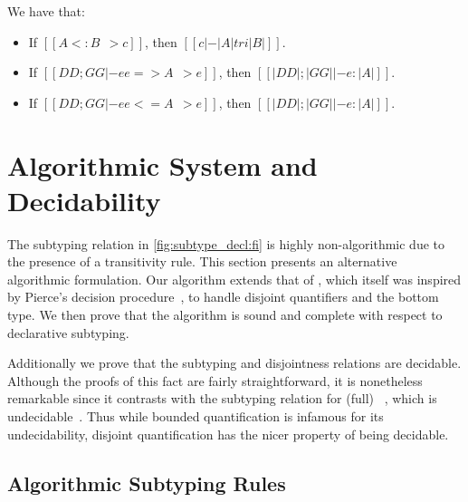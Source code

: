 \begin{lemma} We have that:
  \begin{itemize}
  \item If $[[A <: B ~~> c]]$, then $[[c |-  |A| tri |B|]]$.
  \item If $[[DD ; GG |- ee => A ~~> e]]$, then $[[ |DD| ; |GG| |- e : |A | ]]$.
  \item If $[[DD ; GG |- ee <= A ~~> e]]$, then $[[ |DD| ; |GG| |- e : |A | ]]$.
  \end{itemize}
\end{lemma}




\section{Algorithmic System and Decidability}


The subtyping relation in \cref{fig:subtype_decl:fi} is highly non-algorithmic
due to the presence of a transitivity rule.
This section presents an alternative algorithmic formulation.
Our algorithm extends that of \namee, which itself was inspired by
Pierce's decision
procedure~\cite{pierce1989decision}, to handle
disjoint quantifiers and the bottom type. We then prove that the algorithm is sound and
complete with respect to declarative subtyping.

Additionally we prove that the subtyping and disjointness relations are
decidable. Although the proofs of this fact are fairly straightforward, it is
nonetheless remarkable since it contrasts with the subtyping
relation for (full) \fsub~\cite{cardelli1985understanding}, which is 
undecidable~\cite{pierce1994bounded}. Thus while bounded quantification is
infamous for its undecidability, disjoint quantification has the nicer property
of being decidable.

\subsection{Algorithmic Subtyping Rules}


